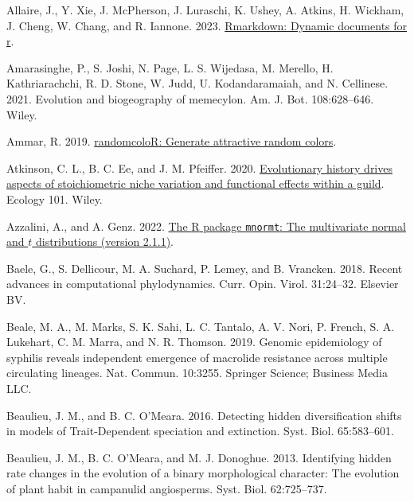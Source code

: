 \documentclass[fleqn,10pt,lineno]{wlpeerj} %
\newlength{\cslhangindent}
\newlength{\cslentryspacingunit} %
\newenvironment{CSLReferences}[2] %
 {%
  \setlength{\parindent}{0pt}
  \ifodd #1
  \let\oldpar\par
  \def\par{\hangindent=\cslhangindent\oldpar}
  \fi
  \setlength{\parskip}{#2\cslentryspacingunit}
 }%
 {}
\begin{document}
\hypertarget{refs}{}
\begin{CSLReferences}{1}{0}
\leavevmode{}%
Allaire, J., Y. Xie, J. McPherson, J. Luraschi, K. Ushey, A. Atkins, H. Wickham, J. Cheng, W. Chang, and R. Iannone. 2023. \href{https://github.com/rstudio/rmarkdown}{Rmarkdown: Dynamic documents for r}.

\leavevmode{}%
Amarasinghe, P., S. Joshi, N. Page, L. S. Wijedasa, M. Merello, H. Kathriarachchi, R. D. Stone, W. Judd, U. Kodandaramaiah, and N. Cellinese. 2021. Evolution and biogeography of memecylon. Am. J. Bot. 108:628--646. Wiley.

\leavevmode{}%
Ammar, R. 2019. \href{https://CRAN.R-project.org/package=randomcoloR}{randomcoloR: Generate attractive random colors}.

\leavevmode{}%
Atkinson, C. L., B. C. Ee, and J. M. Pfeiffer. 2020. \href{https://doi.org/10.1002/ecy.3100}{Evolutionary history drives aspects of stoichiometric niche variation and functional effects within a guild}. Ecology 101. Wiley.

\leavevmode{}%
Azzalini, A., and A. Genz. 2022. \href{http://azzalini.stat.unipd.it/SW/Pkg-mnormt/}{The {R} package \texttt{mnormt}: The multivariate normal and \(t\) distributions (version 2.1.1)}.

\leavevmode{}%
Baele, G., S. Dellicour, M. A. Suchard, P. Lemey, and B. Vrancken. 2018. Recent advances in computational phylodynamics. Curr. Opin. Virol. 31:24--32. Elsevier BV.

\leavevmode{}%
Beale, M. A., M. Marks, S. K. Sahi, L. C. Tantalo, A. V. Nori, P. French, S. A. Lukehart, C. M. Marra, and N. R. Thomson. 2019. Genomic epidemiology of syphilis reveals independent emergence of macrolide resistance across multiple circulating lineages. Nat. Commun. 10:3255. Springer Science; Business Media LLC.

\leavevmode{}%
Beaulieu, J. M., and B. C. O'Meara. 2016. Detecting hidden diversification shifts in models of {Trait-Dependent} speciation and extinction. Syst. Biol. 65:583--601.

\leavevmode{}%
Beaulieu, J. M., B. C. O'Meara, and M. J. Donoghue. 2013. Identifying hidden rate changes in the evolution of a binary morphological character: The evolution of plant habit in campanulid angiosperms. Syst. Biol. 62:725--737.


\end{CSLReferences}
\end{document}
